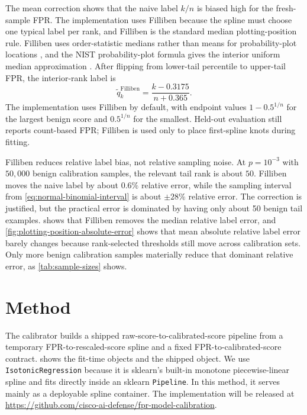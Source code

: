 \documentclass{article}
\begin{document}
The mean correction shows that the naive label $k/n$ is biased high for the fresh-sample FPR.
The implementation uses Filliben because the spline must choose one typical label per rank, and Filliben is the standard median plotting-position rule.
Filliben uses order-statistic medians rather than means for probability-plot locations \citep{filliben1975}, and the NIST probability-plot formula gives the interior uniform median approximation \citep{nistProbabilityPlot}.
After flipping from lower-tail percentile to upper-tail FPR, the interior-rank label is
\begin{equation}
\label{eq:filliben-position}
\widetilde q_k^{\mathrm{Filliben}}=\frac{k-0.3175}{n+0.365}.
\end{equation}
The implementation uses Filliben by default, with endpoint values $1-0.5^{1/n}$ for the largest benign score and $0.5^{1/n}$ for the smallest.
Held-out evaluation still reports count-based FPR; Filliben is used only to place first-spline knots during fitting.

Filliben reduces relative label bias, not relative sampling noise.
At $p=10^{-3}$ with $50{,}000$ benign calibration samples, the relevant tail rank is about $50$.
Filliben moves the naive label by about $0.6\%$ relative error, while the sampling interval from \cref{eq:normal-binomial-interval} is about $\pm28\%$ relative error.
The correction is justified, but the practical error is dominated by having only about 50 benign tail examples.
 shows that Filliben removes the median relative label error, and \cref{fig:plotting-position-absolute-error} shows that mean absolute relative label error barely changes because rank-selected thresholds still move across calibration sets.
Only more benign calibration samples materially reduce that dominant relative error, as \cref{tab:sample-sizes} shows.

\section{Method}
\label{sec:method}

The calibrator builds a shipped raw-score-to-calibrated-score pipeline from a temporary FPR-to-rescaled-score spline and a fixed FPR-to-calibrated-score contract.
 shows the fit-time objects and the shipped object.
We use \texttt{IsotonicRegression} because it is sklearn's built-in monotone piecewise-linear spline and fits directly inside an sklearn \texttt{Pipeline}.
In this method, it serves mainly as a deployable spline container.
The implementation will be released at \url{https://github.com/cisco-ai-defense/fpr-model-calibration}.
\end{document}
